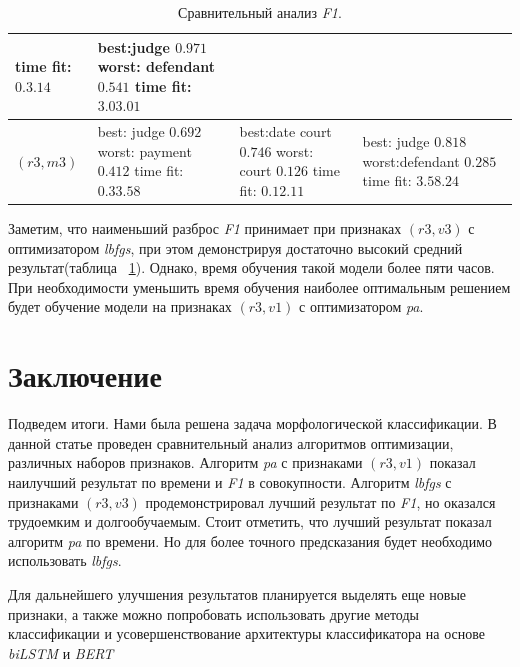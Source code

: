 \documentclass{csmathnotes}
\begin{document}
\begin{table}[!h]
\begin{center}
\begin{tabular}{|p{2.1cm}|p{2.5cm}|p{2.5cm}|p{2.5cm}|}
              time fit:\newline $0.3.14$
            & best:\newline  judge $0.971$\newline
              worst: \newline defendant  $0.541$\newline
              time fit:\newline $3.03.01$\\
            \hline
            $(r3, m3)$
            & best: \newline judge $0.692$ \newline
            worst: \newline payment $0.412$ \newline
            time fit: \newline  $0.33.58$
            & best:\newline   date court   $0.746$ \newline
             worst: \newline court $0.126$ \newline
             time fit: \newline $0.12.11$
            & best: \newline   judge $0.818$ \newline
              worst:\newline defendant $0.285$ \newline 
              time fit: \newline $3.58.24$\\
            \hline
        \end{tabular}
    \end{center}
    \caption{\label{tabl:table2}Сравнительный анализ \emph{F1}.}
\end{table}

Заметим, что наименьший разброс \emph{F1}  принимает при признаках $(r3,v3)$ с оптимизатором \emph{lbfgs}, при этом демонстрируя достаточно высокий средний результат(таблица ~\ref{tabl:table2}). Однако, время обучения такой модели более пяти часов. При необходимости уменьшить время обучения наиболее оптимальным решением будет обучение модели на признаках $(r3,v1)$ с оптимизатором \emph{pa}.

\section*{Заключение}
Подведем итоги. Нами была решена задача морфологической классификации. В данной статье проведен сравнительный анализ алгоритмов оптимизации, различных наборов признаков. Алгоритм \emph{pa} с признаками $(r3, v1)$ показал наилучший результат по времени и \emph{F1}  в совокупности. Алгоритм \emph{lbfgs}  с признаками $(r3, v3)$ продемонстрировал лучший результат по \emph{F1}, но оказался трудоемким и долгообучаемым. Стоит отметить, что лучший результат показал алгоритм \emph{pa} по времени. Но для более точного предсказания будет необходимо использовать \emph{lbfgs}.


Для дальнейшего улучшения результатов планируется выделять еще новые признаки, а также можно попробовать использовать другие методы классификации и усовершенствование архитектуры классификатора на основе \emph{biLSTM} и \emph{BERT}

\printbibliography
\end{document}

